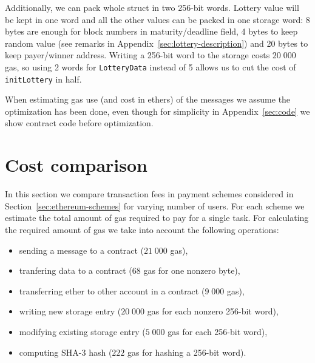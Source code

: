 \documentclass[a4paper]{article}
\begin{document}
    Additionally, we can pack whole struct in two 256-bit
    words. Lottery value will be kept in one word and all the other
    values can be packed in one storage word: 8 bytes are enough for
    block numbers in maturity/deadline field, 4 bytes to keep random
    value (see remarks in Appendix~\ref{sec:lottery-description}) and
    20 bytes to keep payer/winner address.  Writing a 256-bit word to
    the storage costs $20\;000$ gas, so using 2 words for \verb!LotteryData!
    instead of 5 allows us to cut the cost of \verb!initLottery! in half.

    When estimating gas use (and cost in ethers) of the messages we
    assume the optimization has been done, even though for simplicity
    in Appendix~\ref{sec:code} we show contract code before optimization.
    
\section{Cost comparison}
\label{sec:costs}
    In this section we compare transaction fees in payment schemes
    considered in Section~\ref{sec:ethereum-schemes} for varying
    number of users. For each scheme we estimate the total amount of
    gas required to pay for a single task.
    For calculating the required amount of gas we take into account the
    following operations:
    \begin{itemize}
    \item sending a message to a contract ($21\;000$ gas),
    \item tranfering data to a contract ($68$ gas for one nonzero byte),
    \item transferring ether to other account in a contract ($9\;000$ gas),
    \item writing new storage entry ($20\;000$ gas for each nonzero 256-bit word),
    \item modifying existing storage entry ($5\;000$ gas for each 256-bit word),
    \item computing SHA-3 hash ($222$ gas for hashing a 256-bit word).
    \end{itemize}
\end{document}
